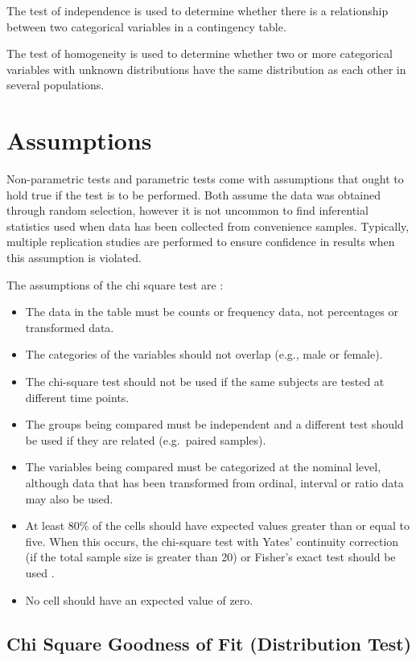 \documentclass[
]{book}
\begin{document}
The test of independence is used to determine whether there is a relationship between two categorical variables in a contingency table.

The test of homogeneity is used to determine whether two or more categorical variables with unknown distributions have the same distribution as each other in several populations.

\hypertarget{assumptions}{%
\section{Assumptions}\label{assumptions}}

Non-parametric tests and parametric tests come with assumptions that ought to hold true if the test is to be performed. Both assume the data was obtained through random selection, however it is not uncommon to find inferential statistics used when data has been collected from convenience samples. Typically, multiple replication studies are performed to ensure confidence in results when this assumption is violated.

The assumptions of the chi square test are \citep{McHugh2013}:

\begin{itemize}
\item
  The data in the table must be counts or frequency data, not percentages or transformed data.
\item
  The categories of the variables should not overlap (e.g., male or female).
\item
  The chi-square test should not be used if the same subjects are tested at different time points.
\item
  The groups being compared must be independent and a different test should be used if they are related (e.g.~paired samples).
\item
  The variables being compared must be categorized at the nominal level, although data that has been transformed from ordinal, interval or ratio data may also be used.
\item
  At least 80\% of the cells should have expected values greater than or equal to five. When this occurs, the chi-square test with Yates' continuity correction (if the total sample size is greater than 20) or Fisher's exact test should be used \citep{chica}.
\item
  No cell should have an expected value of zero.
\end{itemize}

\hypertarget{chi-square-goodness-of-fit-distribution-test}{%
\subsection{Chi Square Goodness of Fit (Distribution Test)}\label{chi-square-goodness-of-fit-distribution-test}}
\end{document}
